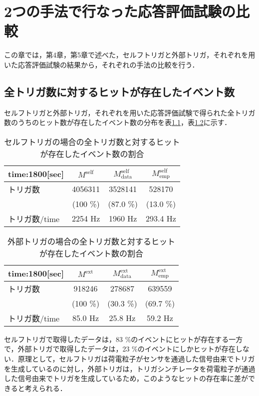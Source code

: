 \chapter{2つの手法で行なった応答評価試験の比較}
この章では，第4章，第5章で述べた，セルフトリガと外部トリガ，それぞれを用いた応答評価試験の結果から，それぞれの手法の比較を行う．

\section{全トリガ数に対するヒットが存在したイベント数}
セルフトリガと外部トリガ，それぞれを用いた応答評価試験で得られた全トリガ数のうちのヒット数が存在したイベント数の分布を表\ref{tab:selfrcomp}，表\ref{tab:extrcomp}に示す．

\begin{table}[h]
  \centering
  \caption{セルフトリガの場合の全トリガ数と対するヒットが存在したイベント数の割合}
  \begin{tabular} {l|ccc} \hline
    time:1800[sec] & $M^{\mathrm{self}}$ & $M_{\mathrm{data}}^{\mathrm{self}}$ & $M_{\mathrm{emp}}^{\mathrm{self}}$ \\ \hline \hline
    トリガ数 & 4056311 & 3528141 & 528170 \\
     & (100 \%) & (87.0 \%) & (13.0 \%) \\ \hline
    トリガ数/time & 2254 $\mathrm{Hz}$ & 1960 $\mathrm{Hz}$ & 293.4 $\mathrm{Hz}$ \\ \hline
  \end{tabular}
  \label{tab:selfrcomp}
\end{table}

\begin{table}[h]
  \centering
  \caption{外部トリガの場合の全トリガ数と対するヒットが存在したイベント数の割合}
  \begin{tabular} {l|ccc} \hline
    time:1800[sec] & $M^{\mathrm{ext}}$ & $M_{\mathrm{data}}^{\mathrm{ext}}$ & $M_{\mathrm{emp}}^{\mathrm{ext}}$ \\ \hline \hline
    トリガ数 & 918246 & 278687 & 639559 \\
     & (100 \%) & (30.3 \%) & (69.7 \%) \\ \hline
    トリガ数/time & 85.0 $\mathrm{Hz}$ & 25.8 $\mathrm{Hz}$ & 59.2 $\mathrm{Hz}$ \\ \hline
  \end{tabular}
  \label{tab:extrcomp}
\end{table}

セルフトリガで取得したデータは，83 \%のイベントにヒットが存在する一方で，外部トリガで取得したデータは，23 \%のイベントにしかヒットが存在しない．原理として，セルフトリガは荷電粒子がセンサを通過した信号由来でトリガを生成しているのに対し，外部トリガは，トリガシンチレータを荷電粒子が通過した信号由来でトリガを生成しているため，このようなヒットの存在率に差ができると考えられる．


